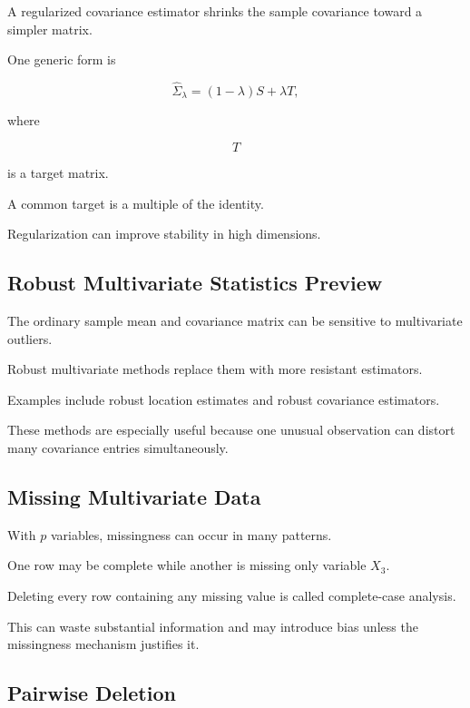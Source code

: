 A regularized covariance estimator shrinks the sample covariance toward a
simpler matrix.

One generic form is

\[
\boxed{
\widehat{\Sigma}_{\lambda}
=
(1-\lambda)S
+
\lambda T,
}
\]

where

\[
T
\]

is a target matrix.

A common target is a multiple of the identity.

Regularization can improve stability in high dimensions.

\subsection{Robust Multivariate Statistics Preview}
\label{subsec:robust-multivariate-preview}

The ordinary sample mean and covariance matrix can be sensitive to
multivariate outliers.

Robust multivariate methods replace them with more resistant estimators.

Examples include robust location estimates and robust covariance
estimators.

These methods are especially useful because one unusual observation can
distort many covariance entries simultaneously.

\subsection{Missing Multivariate Data}
\label{subsec:missing-multivariate-data}

With \(p\) variables, missingness can occur in many patterns.

One row may be complete while another is missing only variable \(X_3\).

Deleting every row containing any missing value is called complete-case
analysis.

This can waste substantial information and may introduce bias unless the
missingness mechanism justifies it.

\subsection{Pairwise Deletion}
\label{subsec:pairwise-deletion}


